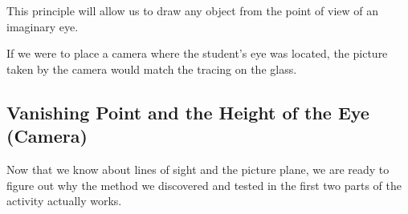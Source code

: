 \documentclass{ximera}
\begin{document}
This principle will allow us to draw any object from the point of view of an imaginary eye.

If we were to place a camera where the student's eye was located, the picture taken by the camera would match the tracing on the glass.

\subsection*{Vanishing Point and the Height of the Eye (Camera)}
Now that we know about lines of sight and the picture plane, we are ready to figure out why the method we discovered and tested in the first two parts of the activity actually works.

\begin{center}
\end{center}
\end{document}
